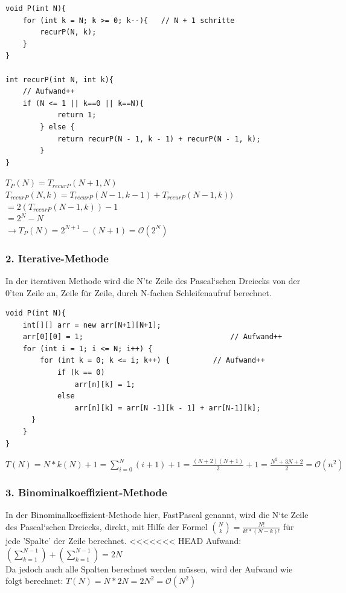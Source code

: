 \documentclass[
   draft=false
  ,paper=a4
  ,twoside=false
  ,fontsize=11pt
  ,headsepline
  ,DIV11
  ,parskip=full+
]{scrartcl} %
\begin{document}
\begin{lstlisting}
void P(int N){
	for (int k = N; k >= 0; k--){   // N + 1 schritte
		recurP(N, k);
	}
}

int recurP(int N, int k){
	// Aufwand++
	if (N <= 1 || k==0 || k==N){
			return 1;                             
		} else {
			return recurP(N - 1, k - 1) + recurP(N - 1, k); 
		}
}
\end{lstlisting}
$ T_P(N) = T_{recurP}(N+1,N)$  \\
$ T_{recurP}(N,k) = T_{recurP}(N-1,k-1)+T_{recurP}(N-1,k)) $  \\
$ = 2(T_{recurP}(N-1,k)) - 1 \quad$ \\
$ = 2^N - N  \, \: \: \qquad \qquad$ \\
$ \rightarrow T_P(N) = 2^{N+1} - (N+1)  = \mathcal{O}(2^N) $

\newpage

\subsubsection*{2. Iterative-Methode}
In der iterativen Methode wird die N'te Zeile des Pascal`schen Dreiecks von der 0'ten Zeile an, Zeile für Zeile, durch N-fachen Schleifenaufruf berechnet.

\begin{lstlisting}
void P(int N){
	int[][] arr = new arr[N+1][N+1];
	arr[0][0] = 1;                                  // Aufwand++
	for (int i = 1; i <= N; i++) {
		for (int k = 0; k <= i; k++) {          // Aufwand++
			if (k == 0)
				arr[n][k] = 1;                     
			else
				arr[n][k] = arr[N -1][k - 1] + arr[N-1][k];
      }
    }
}
\end{lstlisting}
\begin{math}
T(N)= N*k(N) +1 = \sum^N_{i=0}(i+1) + 1 = \frac{(N+2)(N+1)}{2} +1 = \frac{N^2+3N+2}{2} = \mathcal{O}(n^2)
\end{math}
\subsubsection*{3. Binominalkoeffizient-Methode}
In der Binominalkoeffizient-Methode hier, FastPascal genannt, wird die N`te Zeile des Pascal`schen Dreiecks, direkt, mit Hilfe der Formel 
$\binom{N}{k} = \frac{N!}{k!*(N-k)!}$ 
für jede 'Spalte' der Zeile berechnet.
<<<<<<< HEAD
Aufwand: $(\sum\nolimits_{k=1}^{N-1})+(\sum\nolimits_{k=1}^{N-1}) = 2N$ \\
Da jedoch auch alle Spalten berechnet werden müssen, wird der Aufwand wie folgt berechnet:
$T(N)= N* 2N = 2N^2 = \mathcal{O}(N^2)$
\end{document}
